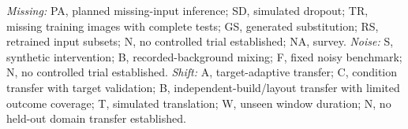 \par\noindent\textit{Missing:} PA, planned missing-input inference; SD, simulated dropout; TR, missing training images with complete tests; GS, generated substitution; RS, retrained input subsets; N, no controlled trial established; NA, survey. \textit{Noise:} S, synthetic intervention; B, recorded-background mixing; F, fixed noisy benchmark; N, no controlled trial established. \textit{Shift:} A, target-adaptive transfer; C, condition transfer with target validation; B, independent-build/layout transfer with limited outcome coverage; T, simulated translation; W, unseen window duration; N, no held-out domain transfer established.
